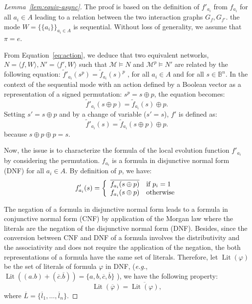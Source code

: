 \documentclass[12pt]{elsarticle}
\newcommand{\tuple}[1]{\langle #1 \rangle}
\newcommand{\Bset}[0]{\mathbb{B}}
\newcommand{\abbrev}[1]{#1, \relax}
\newcommand{\eg}[0]{\abbrev{\textit{e.g.}}}
\renewcommand{\land}[0]{.}
\renewcommand{\lor}[0]{+}
\renewcommand{\lnot}[1]{\overline{#1}}
\newcommand{\lxor}[0]{\oplus}
\begin{document}
\begin{proof}[Lemma~\ref{lem:equiv-async}]
The proof is based on the definition of $f'_{a_i}$ from $f_{a_i}$ for all $a_i \in A$ leading to a relation between the two interaction graphs $G_f, G_{f'}$. the mode $W=\{\{a_i\}\}_{a_i \in A}$ is sequential. Without loss of generality, we assume that $\pi=e$.

\medskip
\noindent
From Equation~\ref{eq:action}, we deduce that two equivalent networks, $N=\tuple{f,W},N'=\tuple{f',W}$ such that $\mathcal M \models N$ and $\mathcal M^p \models N'$ are related by the following equation: $\tilde f'_{a_i}(s^p)= \tilde f_{a_i}(s)^p$ , for all ${a_i} \in A$ and for all $s\in \Bset^n$. In the context of the sequential mode with an action defined by a Boolean vector as a representation of a signed permutation: $s^p = s \lxor p$,
the equation becomes: $$\tilde f'_{a_i} (s \lxor p) = \tilde f_{a_i} (s) \lxor p.$$
Setting $s'=s \lxor p$ and by a change of variable ($s'=s$), $f'$ is defined as:
$$ \tilde f'_{a_i} (s)=\tilde f_{a_i} (s \lxor p) \lxor p.$$
because $s \lxor p \lxor p = s$.

 Now, the issue is to characterize the formula of the local evolution function $f'_{a_i}$ by considering the permutation.
 $f_{a_i}$ is a formula in disjunctive normal form (DNF) for all $a_i \in A$. By definition of $p$, we have:
\begin{equation}
\label{eq:fprime}
 f'_{a_i}(s)= \left \{\begin{array}{l l} 
 \lnot{f_{a_i}(s \lxor p)} & \text{if $p_i=1$} \\
													f_{a_i}(s \lxor p) & \text{otherwise}
													\end{array} \right.
\end{equation}
																																										
The negation of a formula in disjunctive normal form leads to a formula in conjunctive normal form (CNF) by application of the Morgan law where the literals are the negation of the disjunctive normal form (DNF).
Besides, since the conversion between CNF and DNF of a formula involves the distributivity and the associativity and does not require the application of the negation, the both representations of a formula have the same set of literals. Therefore, 
let $\operatorname{Lit}(\varphi)$ be the set of literals of formula $\varphi$ in DNF, (\eg$ \operatorname{Lit}( (a \land b) \lor (\lnot c \land \lnot b))= \{ a, b, \lnot c, \lnot b \}$ ), we have the following property: 
\begin{equation*}
\label{eq:lit}
\operatorname{Lit}(\lnot \varphi)= \lnot{\operatorname{Lit}(\varphi)},
\end{equation*}
 where $\lnot L = \{\lnot l_1, \ldots, \lnot l_n \}$.
	

\end{proof}
\end{document}
